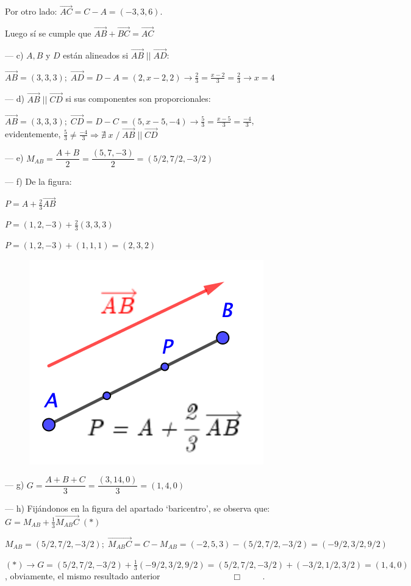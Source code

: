 \begin{ejem}
\noindent Por otro lado: $\overrightarrow {AC}=C-A=(-3, 3, 6)$. 

\noindent Luego sí se cumple que $\overrightarrow {AB}+\overrightarrow {BC}=\overrightarrow{AC}$

\noindent --- c) $A,B$ y $D$ están alineados si $\overrightarrow {AB}\;||\;\overrightarrow {AD}$:

\noindent $\overrightarrow {AB}=(3,3,3); \; \overrightarrow {AD}=D-A=(2,x-2,2) \to \frac 2 3 = \frac {x-2} 3 = \frac 2 3 \to x=4$

\noindent --- d) $\overrightarrow {AB}\; ||\; \overrightarrow {CD}$ si sus componentes son proporcionales:

\noindent $\overrightarrow {AB}=(3,3,3); \; \overrightarrow {CD}=D-C=(5, x-5, -4) \to \frac 5 3 = \frac {x-5} 3 =\frac {-4} 3$, evidentemente, $\frac 5 3 \neq \frac {-4} 3 \Rightarrow \nexists \; x\; / \; \overrightarrow {AB}\;|| \; \overrightarrow {CD}$ 

\noindent --- e) $M_{AB}=\dfrac {A+B} 2 = \dfrac {(5,7,-3)}2=(5/2, 7/2, -3/2)$

\noindent --- f) De la figura: 
\begin{multicols}{2}
\noindent$P=A+\frac 2 3 \overrightarrow {AB}$

\noindent$P=(1,2,-3)+\frac 2 3 (3,3,3)$

\noindent$P=(1,2,-3)+(1,1,1)=(2,3,2)$
\begin{figure}[H]
	\centering
	\includegraphics[width=.3\textwidth]{imagenes/imagenes09/T09IM15.png}
\end{figure}
\end{multicols}

\vspace{-8mm}
\noindent --- g) $G=\dfrac {A+B+C} 3 =\dfrac {(3,14,0)} 3 = (1,4,0)$

\noindent --- h) Fijándonos en la figura del apartado `baricentro', se observa que: $G=M_{AB}+\frac 1 3 \overrightarrow{M_{AB}C} \; (*)$

\noindent $M_{AB}=(5/2,7/2,-3/2); \; \overrightarrow{M_{AB}C}=C-M_{AB}=(-2,5,3)-(5/2,7/2,-3/2)=(-9/2,3/2,9/2)$

\noindent $(*)\to G=(5/2,7/2,-3/2)+\frac 1 3 (-9/2,3/2,9/2)=(5/2,7/2,-3/2)+(-3/2,1/2,3/2)=(1,4,0)$, obviamente, el mismo resultado anterior $\qquad \qquad \qquad \qquad \Box\qquad $ \normalsize{.}

\end{ejem}

